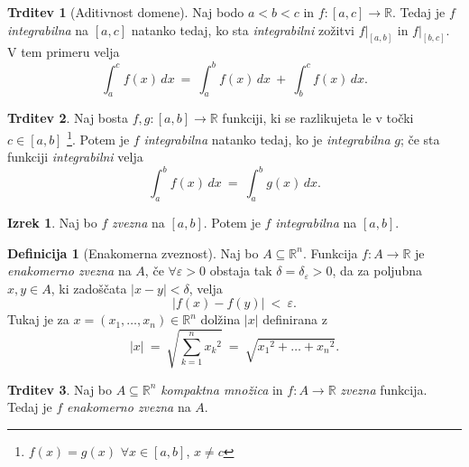 \documentclass[11pt]{article}
\theoremstyle{definition}
\newtheorem{definicija}{Definicija}[section]
\theoremstyle{definition}
\newtheorem{trditev}{Trditev}[section]
\theoremstyle{definition}
\newtheorem{izrek}{Izrek}[section]
\theoremstyle{theorem}
\begin{document}
\begin{trditev}[Aditivnost domene]

Naj bodo $a < b < c$ in $f:[a, c] \rightarrow \mathbb{R}$. Tedaj je $f$ \textit{integrabilna} na $[a, c]$ natanko tedaj, ko sta \textit{integrabilni} zožitvi $f |_{[a, b]}$ in $f |_{[b, c]}$. V tem primeru velja
$$\int_a^c f(x)\,dx ~=~ \int_a^b f(x)\,dx ~+~ \int_b^c f(x)\,dx.$$

\end{trditev}
\vspace{0.5cm}

\begin{trditev}

Naj bosta  $f, g: [a, b] \rightarrow \mathbb{R}$ funkciji, ki se razlikujeta le v točki $c \in [a, b]$ \footnote{$f(x) = g(x)$ $\forall x \in [a, b]$, $x \neq c$}. Potem je $f$ \textit{integrabilna} natanko tedaj, ko je \textit{integrabilna} $g$; če sta funkciji \textit{integrabilni} velja
$$\int_a^b f(x)\,dx ~=~ \int_a^b g(x)\,dx.$$
 
\end{trditev}
\vspace{0.5cm}

\begin{izrek}

Naj bo $f$ \textit{zvezna} na $[a, b]$. Potem je $f$ \textit{integrabilna} na $[a, b]$.

\end{izrek}
\vspace{0.5cm}

\begin{definicija}[Enakomerna zveznost]

Naj bo $A \subseteq \mathbb{R}^n$. Funkcija \hbox{$f: A \rightarrow \mathbb{R}$} je \textit{enakomerno zvezna} na $A$, če $\forall \varepsilon > 0$ obstaja tak $\delta = \delta_\varepsilon > 0$, da za poljubna $x, y \in A$, ki zadoščata $|x-y| < \delta$, velja
$$|f(x) - f(y)| ~<~ \varepsilon.$$ 
Tukaj je za $x = (x_1, \ldots, x_n) \in \mathbb{R}^n$ dolžina $|x|$ definirana z
$$|x| ~=~ \sqrt{\sum_{k=1}^n {x_k}^2} ~=~ \sqrt{{x_1}^2 + \ldots + {x_n}^2}.$$

\end{definicija}
\vspace{0.5cm}

\begin{trditev}

Naj bo $A \subseteq \mathbb{R}^n$ \textit{kompaktna množica} in $f: A \rightarrow \mathbb{R}$ \textit{zvezna} funkcija. Tedaj je $f$ \textit{enakomerno zvezna} na $A$.

\end{trditev}
\vspace{0.5cm}
\end{document}
